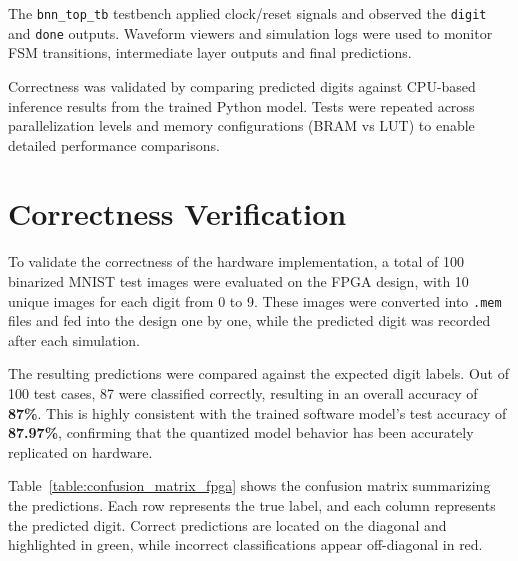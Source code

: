 \documentclass[a4paper,12pt]{report}
\begin{document}
The \texttt{bnn\_top\_tb} testbench applied clock/reset signals and observed the \texttt{digit} and \texttt{done} outputs. Waveform viewers and simulation logs were used to monitor FSM transitions, intermediate layer outputs and final predictions.

Correctness was validated by comparing predicted digits against CPU-based inference results from the trained Python model. Tests were repeated across parallelization levels and memory configurations (BRAM vs LUT) to enable detailed performance comparisons.

\section{Correctness Verification}
To validate the correctness of the hardware implementation, a total of 100 binarized MNIST test images were evaluated on the FPGA design, with 10 unique images for each digit from 0 to 9. These images were converted into \texttt{.mem} files and fed into the design one by one, while the predicted digit was recorded after each simulation.

The resulting predictions were compared against the expected digit labels. Out of 100 test cases, 87 were classified correctly, resulting in an overall accuracy of \textbf{87\%}. This is highly consistent with the trained software model's test accuracy of \textbf{87.97\%}, confirming that the quantized model behavior has been accurately replicated on hardware.

Table~\ref{table:confusion_matrix_fpga} shows the confusion matrix summarizing the predictions. Each row represents the true label, and each column represents the predicted digit. Correct predictions are located on the diagonal and highlighted in green, while incorrect classifications appear off-diagonal in red.
\end{document}
